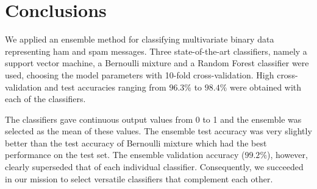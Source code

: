 \section{Conclusions}

We applied an ensemble method for classifying multivariate binary data
representing ham and spam messages. Three state-of-the-art classifiers,
namely a support vector machine, a Bernoulli mixture and a Random Forest
classifier were used, choosing the model parameters with 10-fold
cross-validation. High cross-validation and test accuracies ranging from
$96.3 \%$ to $98.4 \%$ were obtained with each of the classifiers.

The classifiers gave continuous output values from 0 to 1 and the ensemble was selected as the mean of these values. The ensemble test accuracy was very slightly better than the test accuracy of Bernoulli mixture which had the best performance on the test set. The ensemble validation accuracy ($99.2 \%$), however, clearly superseded that of each individual classifier. Consequently, we succeeded in our mission to select versatile classifiers that complement each other.
